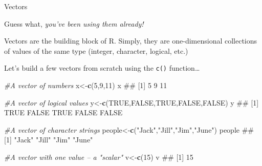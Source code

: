 \documentclass[ignorenonframetext,]{beamer}
\newenvironment{Shaded}{\begin{snugshade}}{\end{snugshade}}
\newcommand{\KeywordTok}[1]{\textcolor[rgb]{0.13,0.29,0.53}{\textbf{#1}}}
\newcommand{\DecValTok}[1]{\textcolor[rgb]{0.00,0.00,0.81}{#1}}
\newcommand{\StringTok}[1]{\textcolor[rgb]{0.31,0.60,0.02}{#1}}
\newcommand{\CommentTok}[1]{\textcolor[rgb]{0.56,0.35,0.01}{\textit{#1}}}
\newcommand{\OtherTok}[1]{\textcolor[rgb]{0.56,0.35,0.01}{#1}}
\newcommand{\NormalTok}[1]{#1}
\begin{document}
\begin{frame}

\begin{block}{Vectors}

Guess what, \emph{you've been using them already!}

Vectors are the building block of R. Simply, they are one-dimensional
collections of values of the same type (integer, character, logical,
etc.)

\end{block}

\end{frame}

\begin{frame}[fragile]

\begin{block}{Let's build a few vectors from scratch using the
\texttt{c()} function\ldots{}}

\begin{Shaded}
\begin{Highlighting}[]
\CommentTok{#A vector of numbers}
\NormalTok{x<-}\KeywordTok{c}\NormalTok{(}\DecValTok{5}\NormalTok{,}\DecValTok{9}\NormalTok{,}\DecValTok{11}\NormalTok{)}
\NormalTok{x}
\NormalTok{## [1]  5  9 11}
\end{Highlighting}
\end{Shaded}

\end{block}

\end{frame}

\begin{frame}[fragile]

\begin{Shaded}
\begin{Highlighting}[]
\CommentTok{#A vector of logical values}
\NormalTok{y<-}\KeywordTok{c}\NormalTok{(}\OtherTok{TRUE}\NormalTok{,}\OtherTok{FALSE}\NormalTok{,}\OtherTok{TRUE}\NormalTok{,}\OtherTok{FALSE}\NormalTok{,}\OtherTok{FALSE}\NormalTok{)}
\NormalTok{y}
\NormalTok{## [1]  TRUE FALSE  TRUE FALSE FALSE}
\end{Highlighting}
\end{Shaded}

\begin{Shaded}
\begin{Highlighting}[]
\CommentTok{#A vector of character strings}
\NormalTok{people<-}\KeywordTok{c}\NormalTok{(}\StringTok{"Jack"}\NormalTok{,}\StringTok{"Jill"}\NormalTok{,}\StringTok{"Jim"}\NormalTok{,}\StringTok{"June"}\NormalTok{)}
\NormalTok{people}
\NormalTok{## [1] "Jack" "Jill" "Jim"  "June"}
\end{Highlighting}
\end{Shaded}

\begin{Shaded}
\begin{Highlighting}[]
\CommentTok{#A vector with one value -- a "scalar"}
\NormalTok{v<-}\KeywordTok{c}\NormalTok{(}\DecValTok{15}\NormalTok{)}
\NormalTok{v}
\NormalTok{## [1] 15}
\end{Highlighting}
\end{Shaded}

\end{frame}
\end{document}
